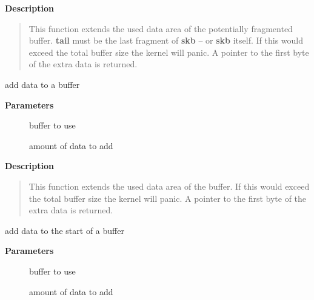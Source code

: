 \documentclass[a4paper,8pt,english]{sphinxmanual}
\begin{document}
\textbf{Description}
\begin{quote}

This function extends the used data area of the potentially
fragmented buffer. \textbf{tail} must be the last fragment of \textbf{skb} -- or
\textbf{skb} itself. If this would exceed the total buffer size the kernel
will panic. A pointer to the first byte of the extra data is
returned.
\end{quote}

\begin{fulllineitems}
\label{networking/kapi:c.skb_put}
add data to a buffer

\end{fulllineitems}


\textbf{Parameters}
\begin{description}
\item[{}] \leavevmode
buffer to use

\item[{}] \leavevmode
amount of data to add

\end{description}

\textbf{Description}
\begin{quote}

This function extends the used data area of the buffer. If this would
exceed the total buffer size the kernel will panic. A pointer to the
first byte of the extra data is returned.
\end{quote}

\begin{fulllineitems}
\label{networking/kapi:c.skb_push}
add data to the start of a buffer

\end{fulllineitems}


\textbf{Parameters}
\begin{description}
\item[{}] \leavevmode
buffer to use

\item[{}] \leavevmode
amount of data to add

\end{description}
\end{document}
